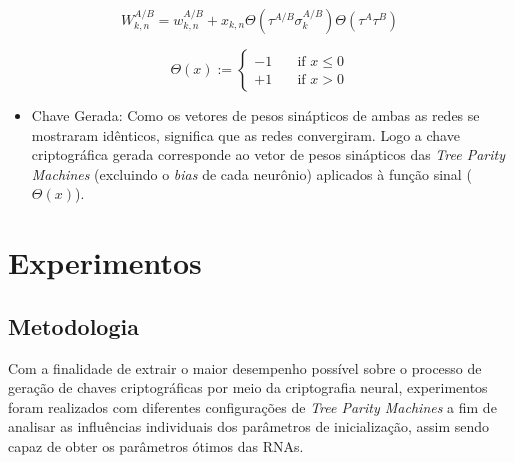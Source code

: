 \documentclass[12pt]{article}
\begin{document}
        \begin{equation}
            \label{eq:randomWalk}
            W_{k,n}^{A/B} = w_{k,n}^{A/B} + x_{k,n} \Theta(\tau^{A/B} \sigma_{k}^{A/B}) \Theta(\tau^{A} \tau^{B})
        \end{equation}

        \begin{equation}
            \label{eq:signal}
            \Theta (x) :=
            \begin{cases}
                -1 & \quad \text{if } x \leq 0 \\
                +1 & \quad \text{if } x > 0
            \end{cases}
        \end{equation}
        
        \begin{itemize}
            \item Chave Gerada:
            Como os vetores de pesos sinápticos de ambas as redes se mostraram idênticos, significa que as redes convergiram. Logo a chave criptográfica gerada corresponde ao vetor de pesos sinápticos das \textit{Tree Parity Machines} (excluindo o \textit{bias} de cada neurônio) aplicados à função sinal (\textit{$\Theta(x)$}).
        \end{itemize}
        
    \section{Experimentos}
    \label{sec:experimentos}
  
        \subsection{Metodologia}
        \label{subsec:metodologia}
            
            Com a finalidade de extrair o maior desempenho possível sobre o processo de geração de chaves criptográficas por meio da criptografia neural, experimentos foram realizados com diferentes configurações de \textit{Tree Parity Machines} a fim de analisar as influências individuais dos parâmetros de inicialização, assim sendo capaz de obter os parâmetros ótimos das RNAs.
            
            \clearpage
            \newpage
            
\end{document}
